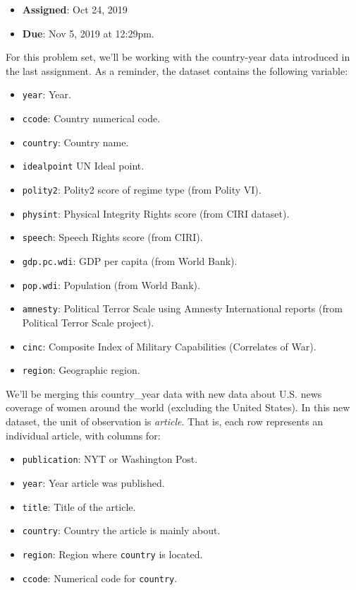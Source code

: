 \documentclass[]{book}
\providecommand{\tightlist}{%
  \setlength{\itemsep}{0pt}\setlength{\parskip}{0pt}}
\begin{document}
\begin{itemize}
\tightlist
\item
  \textbf{Assigned}: Oct 24, 2019
\item
  \textbf{Due}: Nov 5, 2019 at 12:29pm.
\end{itemize}

For this problem set, we'll be working with the country-year data introduced in the last assignment. As a reminder, the dataset contains the following variable:

\begin{itemize}
\tightlist
\item
  \texttt{year}: Year.
\item
  \texttt{ccode}: Country numerical code.
\item
  \texttt{country}: Country name.
\item
  \texttt{idealpoint} UN Ideal point.
\item
  \texttt{polity2}: Polity2 score of regime type (from Polity VI).
\item
  \texttt{physint}: Physical Integrity Rights score (from CIRI dataset).
\item
  \texttt{speech}: Speech Rights score (from CIRI).
\item
  \texttt{gdp.pc.wdi}: GDP per capita (from World Bank).
\item
  \texttt{pop.wdi}: Population (from World Bank).
\item
  \texttt{amnesty}: Political Terror Scale using Amnesty International reports (from Political Terror Scale project).
\item
  \texttt{cinc}: Composite Index of Military Capabilities (Correlates of War).
\item
  \texttt{region}: Geographic region.
\end{itemize}

We'll be merging this country\_year data with new data about U.S. news coverage of women around the world (excluding the United States). In this new dataset, the unit of observation is \emph{article}. That is, each row represents an individual article, with columns for:

\begin{itemize}
\tightlist
\item
  \texttt{publication}: NYT or Washington Post.
\item
  \texttt{year}: Year article was published.
\item
  \texttt{title}: Title of the article.
\item
  \texttt{country}: Country the article is mainly about.
\item
  \texttt{region}: Region where \texttt{country} is located.
\item
  \texttt{ccode}: Numerical code for \texttt{country}.
\end{itemize}
\end{document}
